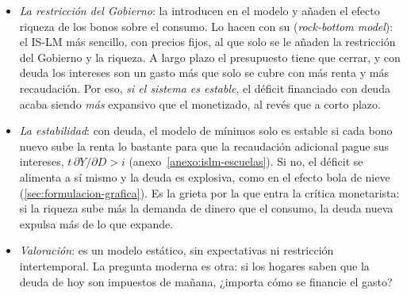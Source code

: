 \documentclass[11pt]{article}
\begin{document}
\begin{itemize}
\begin{itemize}
  \end{itemize}
  El detalle, con los multiplicadores paso a paso, está en el anexo~\ref{anexo:islm-escuelas}.
\item \emph{La restricción del Gobierno}: \textcite{BlinderSolow1973Analytical} la introducen en el modelo y añaden el efecto riqueza de los bonos sobre el consumo. Lo hacen con su  (\emph{rock-bottom model}): el IS-LM más sencillo, con precios fijos, al que solo se le añaden la restricción del Gobierno y la riqueza. A largo plazo el presupuesto tiene que cerrar, y con deuda los intereses son un gasto más que solo se cubre con más renta y más recaudación. Por eso, \emph{si el sistema es estable}, el déficit financiado con deuda acaba siendo \emph{más} expansivo que el monetizado, al revés que a corto plazo.
\item \emph{La estabilidad}: con deuda, el modelo de mínimos solo es estable si cada bono nuevo sube la renta lo bastante para que la recaudación adicional pague sus intereses, $t\,\partial Y/\partial D>i$ (anexo~\ref{anexo:islm-escuelas}). Si no, el déficit se alimenta a sí mismo y la deuda es explosiva, como en el efecto bola de nieve (\ref{sec:formulacion-grafica}). Es la grieta por la que entra la crítica monetarista: si la riqueza sube más la demanda de dinero que el consumo, la deuda nueva expulsa más de lo que expande.
\item \emph{Valoración}: es un modelo estático, sin expectativas ni restricción intertemporal. La pregunta moderna es otra: si los hogares saben que la deuda de hoy son impuestos de mañana, ¿importa cómo se financie el gasto?
\end{itemize}
\end{document}

